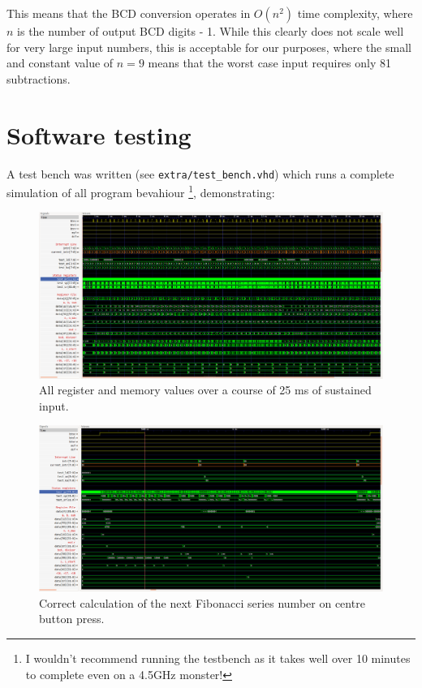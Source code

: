 \documentclass[12pt,a4paper]{article}
\begin{document}
This means that the BCD conversion operates in $O(n^2)$ time
complexity, where $n$ is the number of output BCD digits - 1. While
this clearly does not scale well for very large input numbers, this is
acceptable for our purposes, where the small and constant value of $n
= 9$ means that the worst case input requires only 81 subtractions.

\section{Software testing}

A test bench was written (see \texttt{extra/test\_bench.vhd}) which
runs a complete simulation of all program bevahiour \footnote{I
  wouldn't recommend running the testbench as it takes well over 10
  minutes to complete even on a 4.5GHz monster!}, demonstrating:

\begin{figure}[H]
  \centering
  \includegraphics[width=7.2in]{assets/t0.png}
  \caption{All register and memory values over a course of 25 ms of
    sustained input.}
\end{figure}

\begin{figure}[H]
  \centering
  \includegraphics[width=7.2in]{assets/t1.png}
  \caption{Correct calculation of the next Fibonacci series number on
    centre button press.}
\end{figure}
\end{document}
